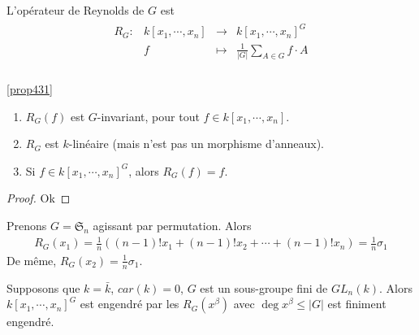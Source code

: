         \begin{defi}
            L'opérateur de Reynolds de $G$ est 
            \begin{align*}
                \begin{array}{cccc}
                    R_G : & k[x_1, \cdots, x_n] & \to & k[x_1, \cdots, x_n]^G \\
                    & f & \mapsto & \frac 1{|G|} \sum_{A \in G} f \cdot A \\
                \end{array}
            \end{align*}
        \end{defi}
        \begin{prop}
            \ref{prop431}
            \begin{enumerate}
                \item $R_G(f)$ est $G$-invariant, pour tout $f \in k[x_1, \cdots, x_n]$.
                \item $R_G$ est $k$-linéaire (mais n'est pas un morphisme d'anneaux).
                \item Si $f \in k[x_1, \cdots, x_n]^G$, alors $R_G(f) = f$.
            \end{enumerate}
        \end{prop}
        \begin{proof}
            Ok
        \end{proof}
        \begin{expl}
            Prenons $G = \mathfrak{S}_n$ agissant par permutation. Alors
            \begin{align*}
                R_G(x_1) = \frac 1n ((n - 1)!x_1 + (n - 1)!x_2 + \cdots + (n - 1)!x_n) = \frac 1n \sigma_1
            \end{align*}
            De même, $R_G(x_2) = \frac 1n \sigma_1$.
        \end{expl}
        \begin{theo} 
            Supposons que $k = \bar k$, $car(k) = 0$, $G$ est un sous-groupe fini de $GL_n(k)$. Alors $k[x_1, \cdots, x_n]^G$ est engendré par les $R_G(x^\beta)$ avec $\deg x^\beta \leq |G|$ est finiment engendré.
        \end{theo}
